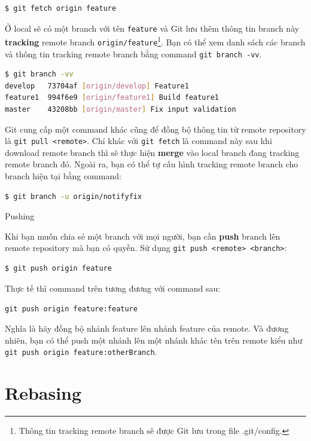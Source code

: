 \documentclass[a4paper, 11pt]{article}
\begin{document}
\begin{lstlisting}[language=bash]
$ git fetch origin feature
\end{lstlisting}

Ở local sẽ có một branch với tên \texttt{feature} và Git lưu thêm thông tin branch này \textbf{tracking} remote branch \texttt{origin/feature}\footnote{Thông tin tracking remote branch sẽ được Git lưu trong file .git/config.}. Bạn có thể xem danh sách các branch và thông tin tracking remote branch bằng command \texttt{git branch -vv}.

\begin{lstlisting}[language=bash]
$ git branch -vv
develop   73704af [origin/develop] Feature1
feature1  994f6e9 [origin/feature1] Build feature1
master    43208bb [origin/master] Fix input validation
\end{lstlisting}

Git cung cấp một command khác cũng để đồng bộ thông tin từ remote repository là \texttt{git pull <remote>}. Chỉ khác với \texttt{git fetch} là command này sau khi download remote branch thì sẽ thực hiện \textbf{merge} vào local branch đang tracking remote branch đó. Ngoài ra, bạn có thể tự cấu hình tracking remote branch cho branch hiện tại bằng command:

\begin{lstlisting}[language=bash]
$ git branch -u origin/notifyfix
\end{lstlisting}

\noindent Pushing

\noindent Khi bạn muốn chia sẻ một branch với mọi người, bạn cần \textbf{push} branch lên remote repository mà bạn có quyền. Sử dụng \texttt{git push <remote> <branch>}:

\begin{lstlisting}[language=bash]
$ git push origin feature
\end{lstlisting}

\noindent Thực tế thì command trên tương đương với command sau: 

\texttt{git push origin feature:feature}

\noindent Nghĩa là hãy đồng bộ nhánh feature lên nhánh feature của remote. Và đương nhiên, bạn có thể push một nhánh lên một nhánh khác tên trên remote kiểu như  \texttt{git push origin feature:otherBranch}.

\clearpage
\section{Rebasing}
\end{document}
